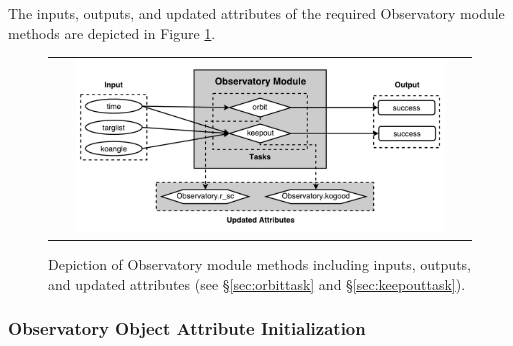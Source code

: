 \documentclass[cleanfoot]{asme2ej}
\newcommand{\reffig}[1]{Figure \ref{#1}}
\begin{document}
The inputs, outputs, and updated attributes of the required Observatory module methods are depicted in  \reffig{fig:observatorymodule}.

\begin{figure}[ht]
    \begin{center}
        \begin{tabular}{c}
             \includegraphics[width=0.9\textwidth]{observatory3}
        \end{tabular}
    \end{center}
    \caption{\label{fig:observatorymodule} Depiction of Observatory module methods including inputs, outputs, and updated attributes (see \S\ref{sec:orbittask} and \S\ref{sec:keepouttask}).}
\end{figure}

\label{sec:observatory}
\subsubsection{Observatory Object Attribute Initialization}
\end{document}
